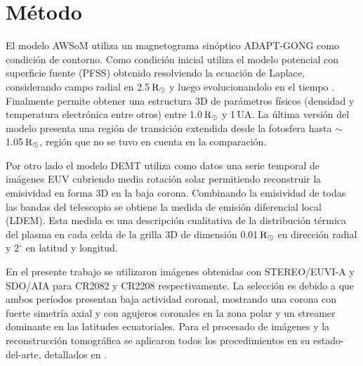 \documentclass[baaa]{baaa}
\begin{document}
\section{Método}
El modelo AWSoM utiliza un magnetograma sinóptico ADAPT-GONG \citep{arge_2010} como condición de contorno. Como condición inicial utiliza el modelo potencial con superficie fuente (PFSS) obtenido resolviendo la ecuación de Laplace, considerando campo radial en 2.5$\,{\rm R_\odot}$ y luego evolucionandolo en el tiempo \citep{vander_2010}. Finalmente permite obtener una estructura 3D de parámetros físicos (densidad y temperatura electrónica entre otros) entre 1.0$\,{\rm R_\odot}$ y 1$\,$UA. La última versión del modelo presenta una región de transición extendida desde la fotosfera hasta $\sim$ 1.05$\,{\rm R_\odot}$, región que no se tuvo en cuenta en la comparación.


Por otro lado el modelo DEMT utiliza como datos una serie temporal de imágenes EUV cubriendo media rotación solar permitiendo reconstruir la emisividad en forma 3D en la baja corona. Combinando la emisividad de todas las bandas del telescopio se obtiene la \rm{medida de emisión diferencial local} (LDEM). Esta medida es una descripción cualitativa de la distribución térmica del plasma en cada celda de la grilla 3D de dimensión 0.01$\,{\rm R_\odot}$ en dirección radial y 2$^{\circ}$ en latitud y longitud.

En el presente trabajo se utilizaron imágenes obtenidas con STEREO/EUVI-A y SDO/AIA para CR2082 y CR2208 respectivamente. La selección es debido a que ambos períodos presentan baja actividad coronal, mostrando una corona con fuerte simetría axial y con agujeros coronales en la zona polar y un streamer dominante en las latitudes ecuatoriales. Para el procesado de imágenes y la reconstrucción tomográfica se aplicaron todos los procedimientos en su estado-del-arte, detallados en \citet{lloveras_ba2017}.

\end{document}
